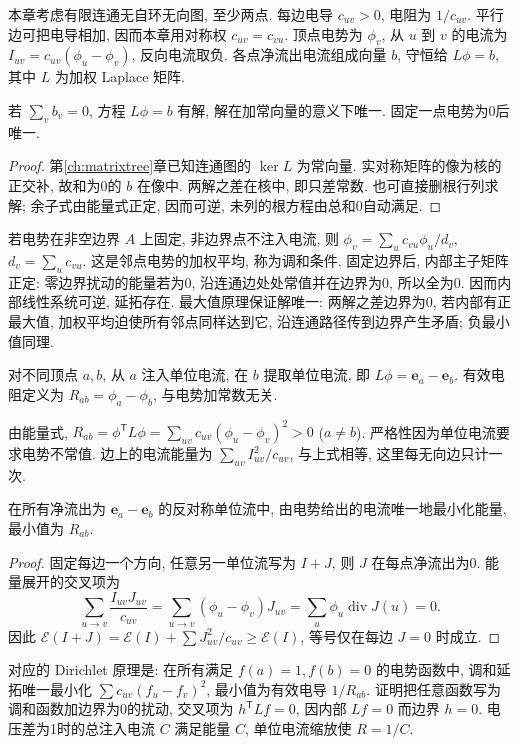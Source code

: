 \label{ch:electrical}
本章考虑有限连通无自环无向图, 至少两点. 每边电导 $c_{uv}>0$, 电阻为 $1/c_{uv}$. 平行边可把电导相加, 因而本章用对称权 $c_{uv}=c_{vu}$. 顶点电势为 $\phi_v$, 从 $u$ 到 $v$ 的电流为 $I_{uv}=c_{uv}(\phi_u-\phi_v)$, 反向电流取负. 各点净流出电流组成向量 $b$, 守恒给 $L\phi=b$, 其中 $L$ 为加权 Laplace 矩阵.
\begin{proposition}\label{prop:potential}
若 $\sum_v b_v=0$, 方程 $L\phi=b$ 有解, 解在加常向量的意义下唯一. 固定一点电势为0后唯一.
\end{proposition}
\begin{proof}
第\ref{ch:matrixtree}章已知连通图的 $\ker L$ 为常向量. 实对称矩阵的像为核的正交补, 故和为0的 $b$ 在像中. 两解之差在核中, 即只差常数. 也可直接删根行列求解; 余子式由能量式正定, 因而可逆, 未列的根方程由总和0自动满足.
\end{proof}
若电势在非空边界 $A$ 上固定, 非边界点不注入电流, 则 $\phi_v=\sum_u c_{vu}\phi_u/d_v$, $d_v=\sum_u c_{vu}$. 这是邻点电势的加权平均, 称为调和条件. 固定边界后, 内部主子矩阵正定: 零边界扰动的能量若为0, 沿连通边处处常值并在边界为0, 所以全为0. 因而内部线性系统可逆, 延拓存在. 最大值原理保证解唯一: 两解之差边界为0, 若内部有正最大值, 加权平均迫使所有邻点同样达到它, 沿连通路径传到边界产生矛盾; 负最小值同理.
\begin{definition}
对不同顶点 $a,b$, 从 $a$ 注入单位电流, 在 $b$ 提取单位电流, 即 $L\phi=\mathbf e_a-\mathbf e_b$. 有效电阻定义为 $R_{ab}=\phi_a-\phi_b$, 与电势加常数无关.
\end{definition}
由能量式, $R_{ab}=\phi^{\mathsf T}L\phi=\sum_{uv}c_{uv}(\phi_u-\phi_v)^2>0$ ($a\ne b$). 严格性因为单位电流要求电势不常值. 边上的电流能量为 $\sum_{uv}I_{uv}^2/c_{uv}$, 与上式相等, 这里每无向边只计一次.
\begin{theorem}[Thomson 原理]\label{thm:thomson}
在所有净流出为 $\mathbf e_a-\mathbf e_b$ 的反对称单位流中, 由电势给出的电流唯一地最小化能量, 最小值为 $R_{ab}$.
\end{theorem}
\begin{proof}
固定每边一个方向, 任意另一单位流写为 $I+J$, 则 $J$ 在每点净流出为0. 能量展开的交叉项为
\[
\sum_{u\to v}\frac{I_{uv}J_{uv}}{c_{uv}}=\sum_{u\to v}(\phi_u-\phi_v)J_{uv}=\sum_u\phi_u\operatorname{div}J(u)=0.
\]
因此 $\mathcal E(I+J)=\mathcal E(I)+\sum J_{uv}^2/c_{uv}\ge\mathcal E(I)$, 等号仅在每边 $J=0$ 时成立.
\end{proof}
对应的 Dirichlet 原理是: 在所有满足 $f(a)=1,f(b)=0$ 的电势函数中, 调和延拓唯一最小化 $\sum c_{uv}(f_u-f_v)^2$, 最小值为有效电导 $1/R_{ab}$. 证明把任意函数写为调和函数加边界为0的扰动, 交叉项为 $h^{\mathsf T}Lf=0$, 因内部 $Lf=0$ 而边界 $h=0$. 电压差为1时的总注入电流 $C$ 满足能量 $C$, 单位电流缩放使 $R=1/C$.

